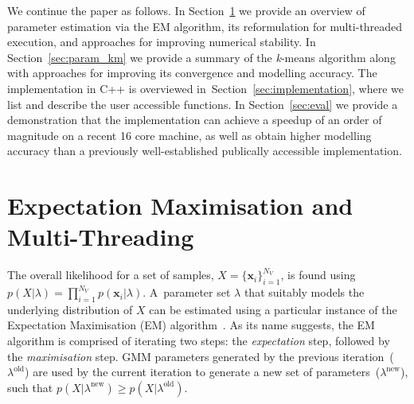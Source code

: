 \documentclass[10pt,a4paper]{article}
\def\Vec#1{{\boldsymbol{#1}}}
\begin{document}
We continue the paper as follows.
In Section~\ref{sec:param_em} we provide an overview of parameter estimation via the EM algorithm,
its reformulation for multi-threaded execution,
and approaches for improving numerical stability.
In Section~\ref{sec:param_km} we provide a summary of the {\it k}-means algorithm
along with approaches for improving its convergence and modelling accuracy.
The implementation in C++ is overviewed in~Section~\ref{sec:implementation},
where we list and describe the user accessible functions.
In Section~\ref{sec:eval}
we provide a demonstration that the implementation can achieve a speedup of an order of magnitude on a recent 16 core machine,
as well as obtain higher modelling accuracy than a previously well-established publically accessible implementation.



\newpage
\section{Expectation Maximisation and Multi-Threading}
\label{sec:param_em}

The overall likelihood for a set of samples, $X=\{\Vec{x}_i\}_{i=1}^{N_V}$,
is found using $p(X | \lambda) = \prod\nolimits_{i=1}^{N_V} p(\Vec{x}_i | \lambda)$.
A~parameter set $\lambda$ that suitably models the underlying distribution of $X$ can be estimated using a particular instance of the Expectation Maximisation (EM) algorithm~\cite{Dempster77, McLachlan-2008, Moon96, Redner84}.
As its name suggests, the EM algorithm is comprised of iterating two steps: the {\it expectation} step, followed by the {\it maximisation} step.
GMM parameters generated by the previous iteration~($\lambda^{\textrm{old}}$) are used
by the current iteration to generate a new set of parameters~($\lambda^{\textrm{new}}$),
such that $p(X|\lambda^{\textrm{new}}) \geq p(X|\lambda^{\textrm{old}})$.
\end{document}
